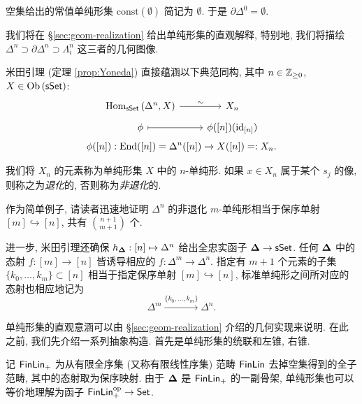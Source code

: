 空集给出的常值单纯形集 $\mathrm{const}(\emptyset)$ 简记为 $\emptyset$. 于是 $\partial \Delta^0 = \emptyset$.

我们将在 \S\ref{sec:geom-realization} 给出单纯形集的直观解释, 特别地, 我们将描绘 $\Delta^n \supset \partial \Delta^n \supset \Lambda^n_i$ 这三者的几何图像.

米田引理 (定理 \ref{prop:Yoneda}) 直接蕴涵以下典范同构, 其中 $n \in \mathbb{Z}_{\geq 0}$, $X \in \operatorname{Ob}\left( \mathsf{sSet} \right)$:
\begin{equation}\begin{gathered}
	\begin{tikzcd}[row sep=tiny]
		\Hom_{\cate{sSet}}\left( \Delta^n, X \right) \arrow[r, "\sim"] & X_n \\
		\phi \arrow[mapsto, r] & \phi([n])(\identity_{[n]})
	\end{tikzcd} \\
	\phi([n]): \End([n]) = \Delta^n([n]) \to X([n]) =: X_n.
\end{gathered}\end{equation}

\begin{definition}\label{def:simplex}
	我们将 $X_n$ 的元素称为单纯形集 $X$ 中的 $n$-单纯形. 如果 $x \in X_n$ 属于某个 $s_j$ 的像, 则称之为\emph{退化}的, 否则称为\emph{非退化}的.
\end{definition}

作为简单例子, 请读者迅速地证明 $\Delta^n$ 的非退化 $m$-单纯形相当于保序单射 $[m] \hookrightarrow [n]$, 共有 $\binom{n+1}{m+1}$ 个.

进一步, 米田引理还确保 $h_{\bm\Delta}: [n] \mapsto \Delta^n$ 给出全忠实函子 $\bm\Delta \to \mathsf{sSet}$. 任何 $\bm\Delta$ 中的态射 $f: [m] \to [n]$ 皆诱导相应的 $f: \Delta^m \to \Delta^n$. 指定有 $m+1$ 个元素的子集 $\{k_0, \ldots, k_m\} \subset [n]$ 相当于指定保序单射 $[m] \hookrightarrow [n]$, 标准单纯形之间所对应的态射也相应地记为
\[ \Delta^m \xrightarrow{\{k_0, \ldots, k_m\}} \Delta^n . \]

单纯形集的直观意涵可以由 \S\ref{sec:geom-realization} 介绍的几何实现来说明. 在此之前, 我们先介绍一系列抽象构造. 首先是单纯形集的统联和左锥, 右锥.

记 $\mathsf{FinLin}_+$ 为从有限全序集 (又称有限线性序集) 范畴 $\mathsf{FinLin}$ 去掉空集得到的全子范畴, 其中的态射取为保序映射. 由于 $\bm\Delta$ 是 $\mathsf{FinLin}_+$ 的一副骨架, 单纯形集也可以等价地理解为函子 $\mathsf{FinLin}_+^{\operatorname{op}} \to \mathsf{Set}$.


